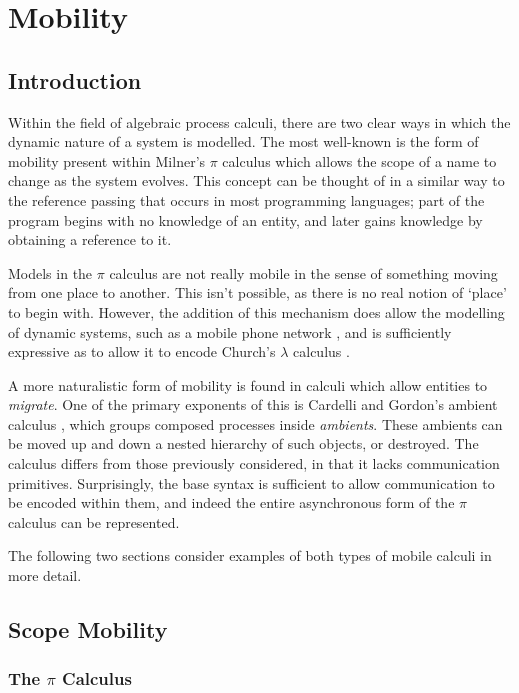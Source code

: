
\chapter{Mobility}
\label{mobility}

\section{Introduction}

Within the field of algebraic process calculi, there are two clear ways
in which the dynamic nature of a system is modelled.  The most
well-known is the form of mobility present within Milner's $\pi$
calculus which allows the scope of a name to change as the system
evolves.  This concept can be thought of in a similar way to the
reference passing that occurs in most programming languages; part of the
program begins with no knowledge of an entity, and later gains knowledge
by obtaining a reference to it.

Models in the $\pi$ calculus are not really mobile in the sense of
something moving from one place to another.  This isn't possible, as
there is no real notion of `place' to begin with.  However, the addition
of this mechanism does allow the modelling of dynamic systems, such as a
mobile phone network \cite{milner:lecture}, and is sufficiently
expressive as to allow it to encode Church's $\lambda$ calculus
\cite{funcproc}.

A more naturalistic form of mobility is found in calculi which allow
entities to \emph{migrate}.  One of the primary exponents of this is
Cardelli and Gordon's ambient calculus \cite{amb}, which groups
composed processes inside \emph{ambients}.  These ambients can be
moved up and down a nested hierarchy of such objects, or destroyed.  The
calculus differs from those previously considered, in that it
lacks communication primitives.  Surprisingly, the base syntax is
sufficient to allow communication to be encoded within them, and
indeed the entire asynchronous form of the $\pi$ calculus can be
represented.

The following two sections consider examples of both types of mobile
calculi in more detail.
 
\section{Scope Mobility}
\label{scopemobility}

\subsection{The $\pi$ Calculus}
\label{picalculus}


